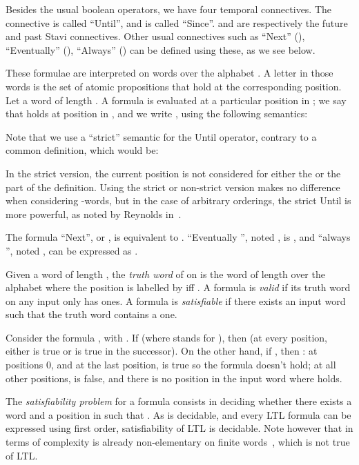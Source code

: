 \documentclass[envcountsame]{fsttcs-ps}
\newcommand{\until}{{Until}\xspace}
\newcommand{\since}{{Since}\xspace}
\newcommand{\tomorrow}{{Next}\xspace}
\newcommand{\eventually}{{Eventually}\xspace}
\newcommand{\always}{{Always}\xspace}
\begin{document}
Besides the usual boolean operators, we have four temporal connectives.  The
 connective is called ``\until'', and  is called ``\since''.
 and  are respectively the future and past Stavi
connectives.  Other usual connectives such as ``\tomorrow'' (),
``\eventually'' (), ``\always'' () can be defined using
these, as we see below.





These formulae are interpreted on words over the alphabet .
A letter in those words is the set of atomic propositions that hold at the
corresponding position.
Let  a word of length .  A formula  is
evaluated at a particular position  in ; we say that  holds at
position  in , and we write , using the following
semantics:


Note that we use a ``strict'' semantic for the \until operator, contrary to a
common definition, which would be:


\noindent In the strict version, the current position  is not considered
for either the  or the  part of the definition.  Using the
strict or non-strict version makes no difference when considering
-words, but in the case of arbitrary orderings, the strict \until is
more powerful, as noted by Reynolds in~\cite{DBLP:journals/jcss/Reynolds03}.

The formula ``\tomorrow '', or , is equivalent to
.  ``Eventually '', noted , is
, and ``always '', noted
, can be expressed as .



Given a word  of length , the \emph{truth word} of  on  is
the word  of length  over the alphabet 
where the position  is labelled by  iff .  A formula
is \emph{valid} if its truth word on any input only has ones.  A formula is
\emph{satisfiable} if there exists an input word such that the truth word
contains a one.

Consider the formula , with
.  If  (where  stands for ),
then  (at every position, either  is true or
 is true in the successor).  On the other hand, if , then : at positions 0,  and at the last position,  is true
so the formula doesn't hold; at all other positions,  is false, and there
is no position in the input word where  holds.


The \emph{satisfiability problem} for a formula  consists in deciding
whether there exists a word  and a position  in  such that
.
As  is decidable, and every LTL formula can be expressed using first
order, satisfiability of LTL is decidable.  Note however that in terms of
complexity  is already non-elementary on finite
words~\cite{stockmeyer74}, which is not true of LTL.
\end{document}
